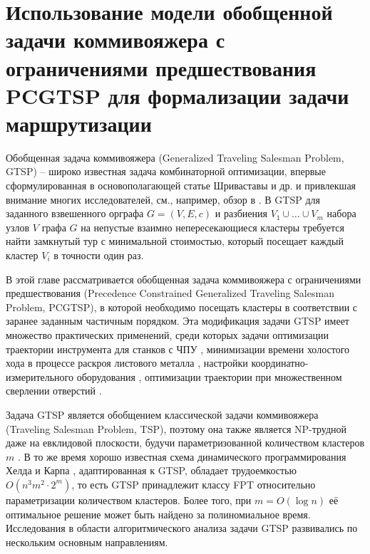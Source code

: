 
\section{
Использование модели обобщенной задачи коммивояжера
с ограничениями предшествования
PCGTSP
для формализации задачи маршрутизации
}
\label{sec:pcgtsp.intro}

Обобщенная задача коммивояжера
(Generalized Traveling Salesman Problem, GTSP)
-- широко известная задача комбинаторной оптимизации,
впервые сформулированная в основополагающей статье Шриваставы и др.
\cite{SKGS1969}
и привлекшая внимание многих исследователей,
см., например, обзор в
\cite{GutinPunnen2007}.
В GTSP для заданного взвешенного орграфа
$ G = (V, E, c) $
и разбиения
$ V_1 \cup \ldots \cup V_m $
набора узлов $V$ графа $G$ на непустые взаимно непересекающиеся кластеры
требуется найти замкнутый тур с минимальной стоимостью,
который посещает каждый кластер
$V_i$
в точности один раз.

В этой главе рассматривается
обобщенная задача коммивояжера с ограничениями предшествования
(Precedence Constrained Generalized Traveling Salesman Problem, PCGTSP),
в которой необходимо посещать кластеры
в соответствии с заранее заданным частичным порядком.
Эта модификация задачи GTSP имеет множество практических применений, среди которых задачи
оптимизации траектории инструмента для станков с ЧПУ  \cite{CASTELINO2003173},
минимизации времени холостого хода в процессе раскроя листового металла \cite{bi:RoMa,Makarovskikh20181171},
настройки координатно-измерительного оборудования \cite{SALMAN2016138},
оптимизации траектории при множественном сверлении отверстий \cite{DEWIL2019}.

Задача GTSP является обобщением классической задачи коммивояжера
(Traveling Salesman Problem, TSP),
поэтому она также является NP-трудной
даже на евклидовой плоскости,
будучи параметризованной количеством кластеров
$m$
\cite{Papa77}.
В то же время хорошо известная схема динамического программирования Хелда и Карпа
\cite{HeldKarp1962},
адаптированная к GTSP,
обладает трудоемкостью
$ O (n ^ 3m ^ 2 \cdot 2 ^ m) $,
то есть
GTSP принадлежит классу FPT
относительно параметризации количеством кластеров.
Более того, при
$ m = O (\log n) $
её оптимальное решение может быть найдено за полиномиальное время.
Исследования в области алгоритмического анализа задачи GTSP
развивались по нескольким основным направлениям.

